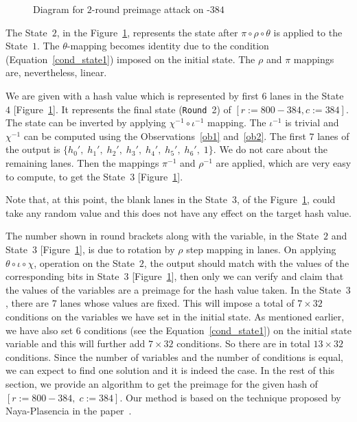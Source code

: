 \begin{figure}[!t]
\begin{center}
{
}
\caption{Diagram for $2$-round preimage attack on \Keccak-$384$ \label{atk}}
\end{center}
\end{figure}
The State~$2$, in the Figure~\ref{atk}, represents the state after $\pi \circ \rho \circ \theta$ is applied to the State~$1$. 
The $\theta$-mapping becomes identity due to the condition
(Equation~\ref{cond_state1}) imposed on the initial state. 
The $\rho$ and $\pi$ mappings are, nevertheless, linear.

We are given with a hash value which is represented by first $6$ lanes in the State~$4$ [Figure~\ref{atk}]. It represents the final state ({\tt Round}~2) of \KECCAK{}$[r:=800-384, c:=384]$. The state can be inverted by applying $\chi^{-1} \circ \iota^{-1}$ mapping. The $\iota^{-1}$ is trivial and $\chi^{-1}$ can be computed using the Observations~\ref{ob1} and~\ref{ob2}. The first $7$ lanes of the output is $\{h_0',\;h_1',\;h_2',\;h_3',\;h_4',\;h_5',\;h_6',\;1\}$. We do not care about the remaining  lanes. 
Then the mappings $\pi^{-1}$ and $\rho^{-1}$ are applied, which are very easy to compute, to get the State~$3$ [Figure~\ref{atk}]. 

Note that, at this point, the blank lanes in the State~$3$, of the Figure~\ref{atk}, could take any random value and this does not have any effect on the target hash value.

The number shown in round brackets along with the variable, in the State~$2$ and State~$3$ [Figure~\ref{atk}], is due to rotation by $\rho$ step mapping in lanes.
On applying $\theta \circ \iota \circ \chi$, operation on the State~$2$, the output should match with the values of the corresponding bits in State~$3$ [Figure~\ref{atk}], then only we can verify and claim that the values of the variables are a preimage for the hash value taken. In the State~$3$, there are $7$ lanes whose values are fixed. 
This will impose a total of $7\times 32$ conditions on the variables we have set in the initial state. As mentioned earlier, we have also set $6$ conditions (see the Equation~\ref{cond_state1}) on the initial state variable and this will further add $7 \times 32$ conditions. So there are in total $13\times 32$ conditions. Since the number of variables and the number of conditions is equal, we can expect to find one solution and it is indeed the case. In the rest of this section, we provide an algorithm to get the preimage for the given hash of  \KECCAK{}$[r:=800-384,\;c:=384]$. Our method is based on the technique proposed by Naya-Plasencia \etal in the paper~\cite{naya2011practical}.

